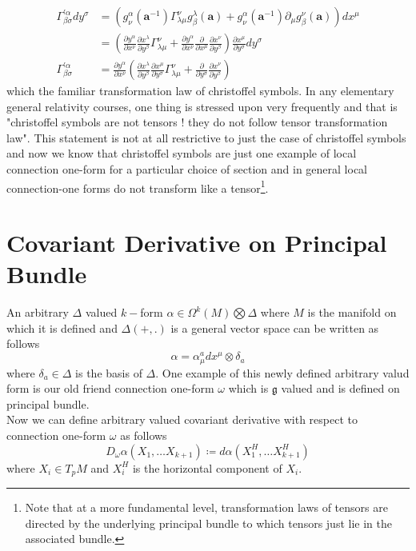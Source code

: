 \documentclass[12pt]{article}
\newcommand{\matr}[1]{\mathbf{#1}}
\begin{document}
\begin{align*}
    \Gamma^{\prime \alpha}_{\beta\sigma}dy^{\sigma} &= (g^{\alpha}_{\nu}(\matr{a}^{-1})\Gamma^{\nu}_{\lambda\mu}g^{\lambda}_{\beta}(\matr{a}) + g^{\alpha}_{\nu}(\matr{a}^{-1})\partial_{\mu} g^{\nu}_{\beta}(\matr{a}))dx^{\mu} \\
                                              &= (\frac{\partial y^{\alpha}}{\partial x^{\nu}}\frac{\partial x^{\lambda}}{\partial y^{\beta}}\Gamma^{\nu}_{\lambda\mu} + \frac{\partial y^{\alpha}}{\partial x^{\nu}}\frac{\partial}{\partial x^{\mu}}\frac{\partial x^{\nu}}{\partial y^{\beta}})\frac{\partial x^{\mu}}{\partial y^{\sigma}}dy^{\sigma} \\
         \Gamma^{\prime \alpha}_{\beta\sigma} &= \frac{\partial y^{\alpha}}{\partial x^{\nu}}(\frac{\partial x^{\lambda}}{\partial y^{\beta}}\frac{\partial x^{\mu}}{\partial y^{\sigma}}\Gamma^{\nu}_{\lambda\mu} + \frac{\partial}{\partial y^{\sigma}}\frac{\partial x^{\nu}}{\partial y^{\beta}})
\end{align*} which the familiar transformation law of christoffel symbols. In any elementary general relativity courses, one thing is stressed upon very frequently and that is "christoffel symbols are not tensors ! they do not follow tensor transformation law". This statement is not at all restrictive to just the case of christoffel symbols and now we know that christoffel symbols are just one example of local connection one-form for a particular choice of section and in general local connection-one forms do not transform like a tensor\footnote{Note that at a more fundamental level, transformation laws of tensors are directed by the underlying principal bundle to which tensors just lie in the associated bundle.}.
\section{Covariant Derivative on Principal Bundle}
An arbitrary $\Delta$ valued $k-$form $\alpha\in \Omega^{k}(M)\bigotimes\Delta$ where $M$ is the manifold on which it is defined and $\Delta(+, .)$ is a general vector space can be written as follows
\[
\alpha = \alpha^{a}_{\mu}dx^{\mu}\otimes\delta_{a}
\] where $\delta_{a}\in\Delta$ is the basis of $\Delta$. One example of this newly defined arbitrary valud form is our old friend connection one-form $\omega$ which is $\mathfrak{g}$ valued and is defined on principal bundle. \\
Now we can define arbitrary valued covariant derivative with respect to connection one-form $\omega$ as follows
\begin{equation}\label{eq:2}
    D_{\omega}\alpha(X_{1}, \dots X_{k+1})\coloneqq d\alpha(X^{H}_{1}, \dots X^{H}_{k+1})
\end{equation} where $X_{i}\in T_{p}M$ and $X^{H}_{i}$ is the horizontal component of $X_{i}$. 
\end{document}
